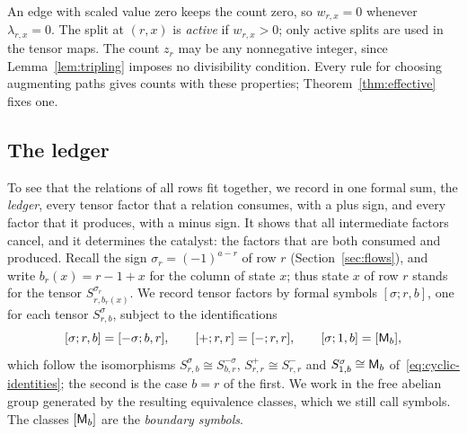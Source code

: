 An edge with scaled value zero keeps the count zero, so \(w_{r,x}=0\)
whenever \(\lambda_{r,x}=0\). The split at \((r,x)\) is \emph{active} if
\(w_{r,x}>0\); only active splits are used in the tensor maps. The count
\(z_r\) may be any nonnegative integer, since Lemma~\ref{lem:tripling}
imposes no divisibility condition. Every rule for choosing augmenting paths
gives counts with these properties; Theorem~\ref{thm:effective} fixes one.

\subsection{The ledger}
\label{subsec:ledger}

To see that the relations of all rows fit together, we record in one
formal sum, the \emph{ledger}, every tensor factor that a relation consumes,
with a plus sign, and every factor that it produces, with a minus sign. It
shows that all intermediate factors cancel, and it determines the catalyst:
the factors that are both consumed and produced. Recall the sign
\(\sigma_r=(-1)^{a-r}\) of row \(r\) (Section~\ref{sec:flows}), and write \(b_r(x)=r-1+x\) for the column of
state \(x\); thus state \(x\) of row \(r\) stands for the tensor
\(S^{\sigma_r}_{r,b_r(x)}\). We record tensor factors by formal symbols
\([\sigma;r,b]\), one for each tensor \(S^\sigma_{r,b}\), subject to the
identifications
\begin{equation}\label{eq:symbol-identifications}
 [\sigma;r,b]=[-\sigma;b,r],\qquad
 [+;r,r]=[-;r,r],\qquad
 [\sigma;1,b]=[\mathsf M_b],
\end{equation}
which follow the isomorphisms \(S^\sigma_{r,b}\cong S^{-\sigma}_{b,r}\),
\(S^+_{r,r}\cong S^-_{r,r}\) and \(S^\sigma_{1,b}\cong\mathsf M_b\)
of~\eqref{eq:cyclic-identities}; the second is the case \(b=r\) of the
first. We work in the free abelian group generated by the resulting
equivalence classes, which we still call symbols. The classes \([\mathsf M_b]\)
are the \emph{boundary symbols}.

